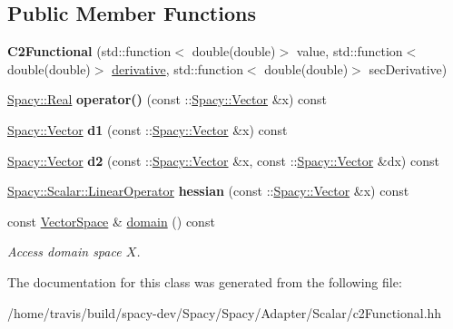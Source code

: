 \subsection*{\-Public \-Member \-Functions}
\begin{DoxyCompactItemize}
\item 
\hypertarget{classSpacy_1_1Scalar_1_1C2Functional_a6458c77ba0a55aace7bd3e739078b25b}{{\bfseries \-C2\-Functional} (std\-::function$<$ double(double)$>$ value, std\-::function$<$ double(double)$>$ \hyperlink{namespaceSpacy_a002fe344fa6d04a6ac59a74ea25fddb6}{derivative}, std\-::function$<$ double(double)$>$ sec\-Derivative)}\label{classSpacy_1_1Scalar_1_1C2Functional_a6458c77ba0a55aace7bd3e739078b25b}

\item 
\hypertarget{classSpacy_1_1Scalar_1_1C2Functional_a925d8325d3d58de9ccf82fb4c20a7f87}{\hyperlink{classSpacy_1_1Real}{\-Spacy\-::\-Real} {\bfseries operator()} (const \-::\hyperlink{classSpacy_1_1Vector}{\-Spacy\-::\-Vector} \&x) const }\label{classSpacy_1_1Scalar_1_1C2Functional_a925d8325d3d58de9ccf82fb4c20a7f87}

\item 
\hypertarget{classSpacy_1_1Scalar_1_1C2Functional_ac6baf3f5a3e1fbb1a2dc8172b0d471d5}{\hyperlink{classSpacy_1_1Vector}{\-Spacy\-::\-Vector} {\bfseries d1} (const \-::\hyperlink{classSpacy_1_1Vector}{\-Spacy\-::\-Vector} \&x) const }\label{classSpacy_1_1Scalar_1_1C2Functional_ac6baf3f5a3e1fbb1a2dc8172b0d471d5}

\item 
\hypertarget{classSpacy_1_1Scalar_1_1C2Functional_adcb4d9ed480a86199c82f1d1a97fe6dc}{\hyperlink{classSpacy_1_1Vector}{\-Spacy\-::\-Vector} {\bfseries d2} (const \-::\hyperlink{classSpacy_1_1Vector}{\-Spacy\-::\-Vector} \&x, const \-::\hyperlink{classSpacy_1_1Vector}{\-Spacy\-::\-Vector} \&dx) const }\label{classSpacy_1_1Scalar_1_1C2Functional_adcb4d9ed480a86199c82f1d1a97fe6dc}

\item 
\hypertarget{classSpacy_1_1Scalar_1_1C2Functional_aee5a5f9a601aa339c67ec57e44806343}{\hyperlink{structSpacy_1_1Scalar_1_1LinearOperator}{\-Spacy\-::\-Scalar\-::\-Linear\-Operator} {\bfseries hessian} (const \-::\hyperlink{classSpacy_1_1Vector}{\-Spacy\-::\-Vector} \&x) const }\label{classSpacy_1_1Scalar_1_1C2Functional_aee5a5f9a601aa339c67ec57e44806343}

\item 
\hypertarget{classSpacy_1_1FunctionalBase_a2d3397deb9fa1ad85ed04e37a03b3aa6}{const \hyperlink{classSpacy_1_1VectorSpace}{\-Vector\-Space} \& \hyperlink{classSpacy_1_1FunctionalBase_a2d3397deb9fa1ad85ed04e37a03b3aa6}{domain} () const }\label{classSpacy_1_1FunctionalBase_a2d3397deb9fa1ad85ed04e37a03b3aa6}

\begin{DoxyCompactList}\small\item\em \-Access domain space $X$. \end{DoxyCompactList}\end{DoxyCompactItemize}


\-The documentation for this class was generated from the following file\-:\begin{DoxyCompactItemize}
\item 
/home/travis/build/spacy-\/dev/\-Spacy/\-Spacy/\-Adapter/\-Scalar/c2\-Functional.\-hh\end{DoxyCompactItemize}
